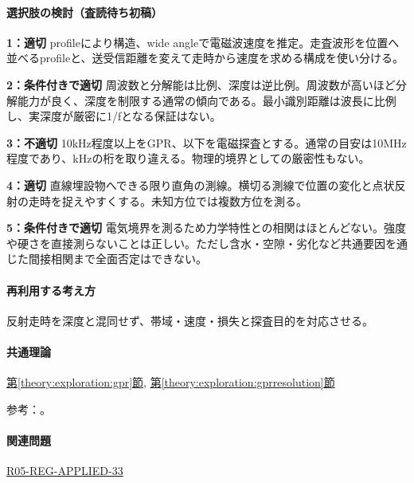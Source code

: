\paragraph{選択肢の検討（査読待ち初稿）}\mbox{}\par

\noindent\textbf{1：適切} profileにより構造、wide angleで電磁波速度を推定。走査波形を位置へ並べるprofileと、送受信距離を変えて走時から速度を求める構成を使い分ける。\par

\noindent\textbf{2：条件付きで適切} 周波数と分解能は比例、深度は逆比例。周波数が高いほど分解能力が良く、深度を制限する通常の傾向である。最小識別距離は波長に比例し、実深度が厳密に1/fとなる保証はない。\par

\noindent\textbf{3：不適切} 10kHz程度以上をGPR、以下を電磁探査とする。通常の目安は10MHz程度であり、kHzの桁を取り違える。物理的境界としての厳密性もない。\par

\noindent\textbf{4：適切} 直線埋設物へできる限り直角の測線。横切る測線で位置の変化と点状反射の走時を捉えやすくする。未知方位では複数方位を測る。\par

\noindent\textbf{5：条件付きで適切} 電気境界を測るため力学特性との相関はほとんどない。強度や硬さを直接測らないことは正しい。ただし含水・空隙・劣化など共通要因を通じた間接相関まで全面否定はできない。\par

\paragraph{再利用する考え方} 反射走時を深度と混同せず、帯域・速度・損失と探査目的を対応させる。

\paragraph{共通理論} \hyperref[theory:exploration:gpr]{第\ref*{theory:exploration:gpr}節}, \hyperref[theory:exploration:gprresolution]{第\ref*{theory:exploration:gprresolution}節}

\par 参考：\cite{epa_gpr}。

\paragraph{関連問題} \hyperref[q:r05-reg-applied-33]{R05-REG-APPLIED-33}

